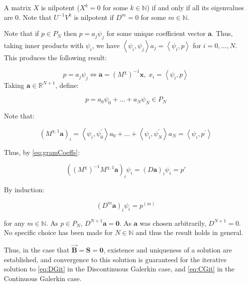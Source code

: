 \documentclass[twoside,english,final,5p,times,twocolumn]{elsarticle}
\begin{document}
A matrix $X$ is nilpotent ($X^{k}=0$ for some $k\in\mathbb{N}$)
if and only if all its eigenvalues are 0. Note that $U^{-1}V^{k}$
is nilpotent if $D^{m}=0$ for some $m\in\mathbb{N}$.

Note that if $p\in P_{N}$ then $p=a_{j}\psi_{j}$ for some unique
coefficient vector $\boldsymbol{a}$. Thus, taking inner products
with $\psi_{i}$, we have $\left\langle \psi_{i},\psi_{j}\right\rangle a_{j}=\left\langle \psi_{i},p\right\rangle $
for $i=0,...,N$. This produces the following result:

\begin{equation}
p=a_{j}\psi_{j}\Leftrightarrow\boldsymbol{a}=\left(M^{\chi}\right)^{-1}\boldsymbol{x},\;x_{i}=\left\langle \psi_{i},p\right\rangle \label{eq:gramCoeffs}
\end{equation}
 Taking $\boldsymbol{a}\in\mathbb{R}^{N+1}$, define:

\begin{equation}
p=a_{0}\psi_{0}+\ldots+a_{N}\psi_{N}\in P_{N}
\end{equation}

Note that:

\begin{equation}
\left(M^{\chi,1}\boldsymbol{a}\right)_{i}=\left\langle \psi_{i},\psi_{0}^{'}\right\rangle a_{0}+\ldots+\left\langle \psi_{i},\psi_{N}^{'}\right\rangle a_{N}=\left\langle \psi_{i},p^{'}\right\rangle 
\end{equation}

Thus, by \eqref{eq:gramCoeffs}:

\begin{equation}
\left(\left(M^{\chi}\right)^{-1}M^{\chi,1}\boldsymbol{a}\right)_{i}\psi_{i}=\left(D\boldsymbol{a}\right)_{i}\psi_{i}=p'
\end{equation}

By induction:

\begin{equation}
\left(D^{m}\boldsymbol{a}\right)_{i}\psi_{i}=p^{\left(m\right)}
\end{equation}

for any $m\in\mathbb{N}$. As $p\in P_{N}$, $D^{N+1}\boldsymbol{a}=\boldsymbol{0}$.
As $\boldsymbol{a}$ was chosen arbitrarily, $D^{N+1}=0$. No specific
choice has been made for $N\in\mathbb{N}$ and thus the result holds
in general.

Thus, in the case that $\overrightarrow{\boldsymbol{B}}=\boldsymbol{S}=\boldsymbol{0}$,
existence and uniqueness of a solution are established, and convergence
to this solution is guaranteed for the iterative solution to \eqref{eq:DGit}
in the Discontinuous Galerkin case, and \eqref{eq:CGit} in the Continuous
Galerkin case.
\end{document}
